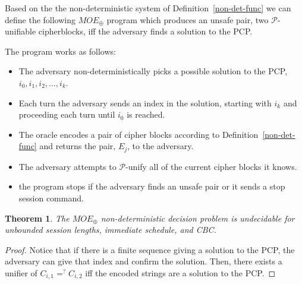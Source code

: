 \documentclass[11pt,twoside,a4paper]{article}
\newtheorem{theorem}{Theorem}
\begin{document}
Based on the the non-deterministic system of 
Definition~\ref{non-det-func} we can define the following
$MOE_{\oplus}$ program which produces an unsafe pair, 
two $\mathcal{P}$-unifiable cipherblocks, iff the adversary
finds a solution to the PCP.

The program works as follows:
\begin{itemize}
	\item The adversary non-deterministically picks a possible
	solution to the PCP, $i_0, i_1, i_2, \ldots, i_k$.
	\item Each turn the adversary sends an index in the solution, 
	starting with $i_k$ and proceeding each turn until $i_0$ 
	is reached. 
	\item The oracle encodes a pair of cipher blocks according 
	to Definition~\ref{non-det-func} and returns the pair,
	$E_j$, to the adversary.
	\item The adversary attempts to $\mathcal{P}$-unify 
	all of the current cipher blocks it knows.
	\item the program stops if the adversary finds an unsafe
	pair or it sends a stop session command.
\end{itemize}

\begin{theorem}
	The $MOE_{\oplus}$ non-deterministic decision problem is undecidable for unbounded session lengths, immediate schedule, and CBC.
\end{theorem}
\begin{proof}
	Notice that if there is a finite sequence giving a solution
	to the PCP, the adversary can give that index and confirm the
	solution. 
	Then, there exists a unifier of $C_{i,1} =^{?} C_{i,2}$ iff
	the encoded strings are a solution to the PCP.  
\end{proof}
\end{document}

